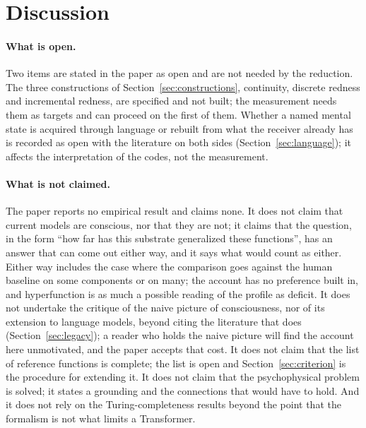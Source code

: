 \section{Discussion}
\label{sec:discussion}
\label{sec:reader}
\label{sec:difficulties}

\paragraph{What is open.}
Two items are stated in the paper as open and are not needed by the reduction. The three constructions of
Section~\ref{sec:constructions}, continuity, discrete redness and incremental redness, are specified
and not built; the measurement needs them as targets and can proceed on the first of them. Whether a
named mental state is acquired through language or rebuilt from what the receiver already has is
recorded as open with the literature on both sides (Section~\ref{sec:language}); it affects the
interpretation of the codes, not the measurement.

\paragraph{What is not claimed.}
The paper reports no empirical result and claims none. It does not claim that current models are
conscious, nor that they are not; it claims that the
question, in the form ``how far has this substrate generalized these functions'', has an answer that
can come out either way, and it says what would count as either. Either way includes the case where
the comparison goes against the human baseline on some components or on many; the account has no
preference built in, and hyperfunction is as much a possible reading of the profile as deficit. It does not undertake the critique of the naive picture of consciousness, nor of its extension to
language models, beyond citing the literature that does (Section~\ref{sec:legacy}); a reader who
holds the naive picture will find the account here unmotivated, and the paper accepts that cost. It
does not claim that the list of
reference functions is complete; the list is open and Section~\ref{sec:criterion} is the procedure for
extending it. It does not claim that the psychophysical problem is solved; it states a grounding and
the connections that would have to hold. And it does not rely on the Turing-completeness results
beyond the point that the formalism is not what limits a Transformer.

